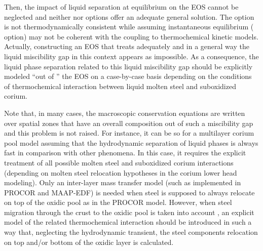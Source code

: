 Then, the impact of liquid separation at equilibrium on the EOS cannot be neglected and neither  nor  options offer an adequate general solution. The  option is not thermodynamically consistent while assuming instantaneous equilibrium ( option) may not be coherent with the coupling to thermochemical kinetic models. Actually, constructing an EOS that treats adequately and in a general way the liquid miscibility gap in this context appears as impossible. As a consequence, the liquid phase separation related to this liquid miscibility gap should be explicitly modeled ``out of '' the EOS on a case-by-case basis depending on the conditions of thermochemical interaction between liquid molten steel and suboxidized corium. 
\begin{remark}
 Note that, in many cases, the macroscopic conservation equations are written over spatial zones that have an overall composition out of such a miscibility gap and this problem is not raised. For instance, it can be so for a multilayer corium pool model assuming that the hydrodynamic separation of liquid phases is always fast in comparison with other phenomena. In this case, it requires the explicit treatment of all possible molten steel and suboxidized corium interactions (depending on molten steel relocation hypotheses in the corium lower head modeling). Only an inter-layer mass transfer model (such as \cite{LeTellier2014} implemented in PROCOR and MAAP-EDF) is needed when steel is supposed to always relocate on top of the oxidic pool as in the PROCOR model. However, when steel migration through the crust to the oxidic pool is taken into account , an explicit model of the related thermochemical interaction should be introduced in such a way that, neglecting the hydrodynamic transient, the steel components relocation on top and/or bottom of the oxidic layer is calculated.
\end{remark}

